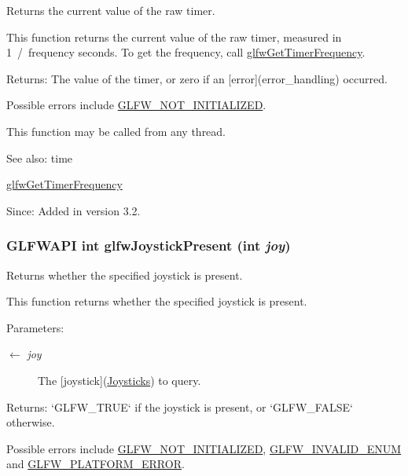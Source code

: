 Returns the current value of the raw timer. 

This function returns the current value of the raw timer, measured in 1~/~frequency seconds. To get the frequency, call \hyperlink{group__input_ga92d10b10013372778efbf6367714371}{glfwGetTimerFrequency}.

\begin{Desc}
\item[Returns:]The value of the timer, or zero if an \mbox{[}error\mbox{]}(error\_\-handling) occurred.\end{Desc}
Possible errors include \hyperlink{group__errors_g2374ee02c177f12e1fa76ff3ed15e14a}{GLFW\_\-NOT\_\-INITIALIZED}.

This function may be called from any thread.

\begin{Desc}
\item[See also:]time 

\hyperlink{group__input_ga92d10b10013372778efbf6367714371}{glfwGetTimerFrequency}\end{Desc}
\begin{Desc}
\item[Since:]Added in version 3.2. \end{Desc}
\hypertarget{group__input_g7f81f22f355f4b7d315caf73cdfd9906}{
\subsubsection[glfwJoystickPresent]{\setlength{\rightskip}{0pt plus 5cm}GLFWAPI int glfwJoystickPresent (int {\em joy})}}
\label{group__input_g7f81f22f355f4b7d315caf73cdfd9906}


Returns whether the specified joystick is present. 

This function returns whether the specified joystick is present.

\begin{Desc}
\item[Parameters:]
\begin{description}
\item[\mbox{$\leftarrow$} {\em joy}]The \mbox{[}joystick\mbox{]}(\hyperlink{group__joysticks}{Joysticks}) to query. \end{description}
\end{Desc}
\begin{Desc}
\item[Returns:]`GLFW\_\-TRUE` if the joystick is present, or `GLFW\_\-FALSE` otherwise.\end{Desc}
Possible errors include \hyperlink{group__errors_g2374ee02c177f12e1fa76ff3ed15e14a}{GLFW\_\-NOT\_\-INITIALIZED}, \hyperlink{group__errors_g76f6bb9c4eea73db675f096b404593ce}{GLFW\_\-INVALID\_\-ENUM} and \hyperlink{group__errors_gd44162d78100ea5e87cdd38426b8c7a1}{GLFW\_\-PLATFORM\_\-ERROR}.

